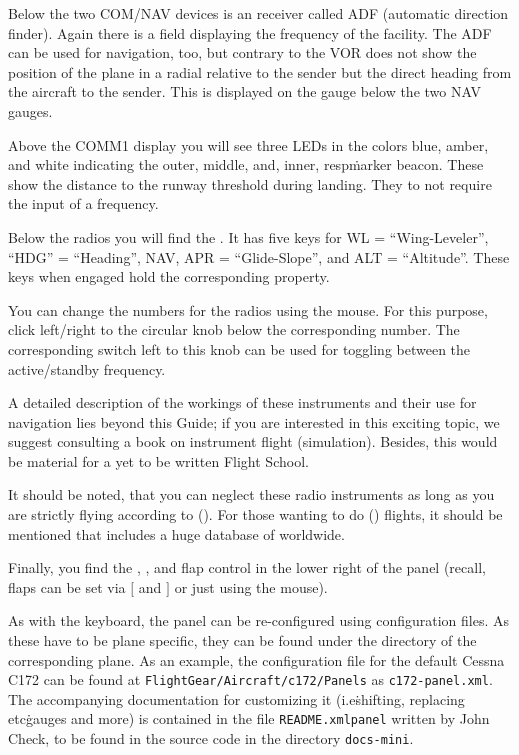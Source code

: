 Below the two COM/NAV devices is an  receiver called ADF (automatic
direction
finder). Again there is a field displaying the frequency of the facility. The
ADF can be
used for navigation, too, but contrary to the VOR does not show the position of
the plane
in a radial relative to the sender but the direct heading from the aircraft to
the
sender. This is displayed on the gauge below the two NAV gauges.

Above the COMM1 display you will see three LEDs in the colors blue, amber, and
white
indicating the outer, middle, and, inner, resp\. marker beacon. These show the distance to the
runway
threshold during landing. They to not require the input of a frequency. 

Below the radios you will find the . It has five keys
for WL = ``Wing-Leveler'', ``HDG'' = ``Heading'', NAV, APR =
``Glide-Slope'', and ALT = ``Altitude''. These keys when engaged hold
the corresponding property.

You can change the numbers for the radios using the mouse. For this
purpose, click left/right to the circular knob below the corresponding
number. The corresponding switch left to this knob can be used for
toggling between the active/standby frequency.

A detailed description of the workings of these instruments and their use for
navigation
lies beyond this Guide; if you are interested in this exciting topic, we suggest
consulting a book on instrument flight (simulation). Besides, this would be
material for
a yet to be written \FlightGear{} Flight School. 

It should be noted, that you can neglect these radio instruments as
long as you are strictly flying according to  (). For those wanting to do  () flights, it should be mentioned that \FlightGear{}
includes a huge database of  worldwide.

Finally, you find the , , and flap
control in
the lower right of the panel (recall, flaps can be set via $[$ and $]$ or just
using the mouse).

As with the keyboard, the panel can be
re-configured using
configuration files. As these have to be plane specific, they can be found under
the
directory of the corresponding plane. As an example, the configuration file for
the
default Cessna C172 can be found at \texttt{FlightGear/Aircraft/c172/Panels} as
\texttt{c172-panel.xml}. The accompanying documentation for customizing it
(i.e\. shifting,
replacing etc\. gauges and more) is contained in the file
\texttt{README.xmlpanel} 
written by John Check,
to be found in the source code in the directory \texttt{docs-mini}.

